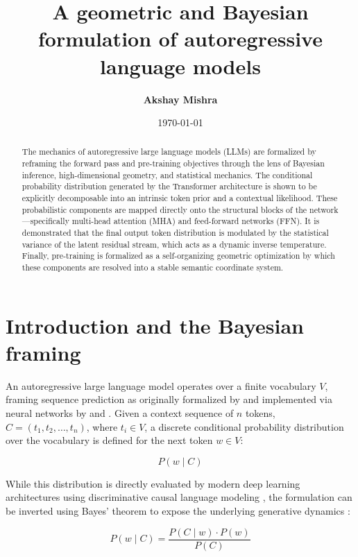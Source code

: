 \documentclass[11pt,a4paper]{article}
\title{\textbf{A geometric and Bayesian formulation of autoregressive language models}}
\author{\textbf{Akshay Mishra}}
\date{\today}
\begin{document}
	
	\maketitle
	
	\begin{abstract}
		The mechanics of autoregressive large language models (LLMs) are formalized by reframing the forward pass and pre-training objectives through the lens of Bayesian inference, high-dimensional geometry, and statistical mechanics. The conditional probability distribution generated by the Transformer architecture is shown to be explicitly decomposable into an intrinsic token prior and a contextual likelihood. These probabilistic components are mapped directly onto the structural blocks of the network---specifically multi-head attention (MHA) and feed-forward networks (FFN). It is demonstrated that the final output token distribution is modulated by the statistical variance of the latent residual stream, which acts as a dynamic inverse temperature. Finally, pre-training is formalized as a self-organizing geometric optimization by which these components are resolved into a stable semantic coordinate system.
	\end{abstract}
	
	
	\section{Introduction and the Bayesian framing}
	
	An autoregressive large language model operates over a finite vocabulary $V$, framing sequence prediction as originally formalized by \citet{shannon1948mathematical} and implemented via neural networks by \citet{bengio2003neural} and \citet{mikolov2010recurrent}. Given a context sequence of $n$ tokens, $C = (t_1, t_2, \dots, t_n)$, where $t_i \in V$, a discrete conditional probability distribution over the vocabulary is defined for the next token $w \in V$:
	
	\begin{equation}
		P(w \mid C)
	\end{equation}
	
	While this distribution is directly evaluated by modern deep learning architectures using discriminative causal language modeling \citep{Radford2019LanguageMA}, the formulation can be inverted using Bayes' theorem to expose the underlying generative dynamics \citep{jaynes1957}:
	
	\begin{equation}
		P(w \mid C) = \frac{P(C \mid w) \cdot P(w)}{P(C)}
	\end{equation}
	
\end{document}
